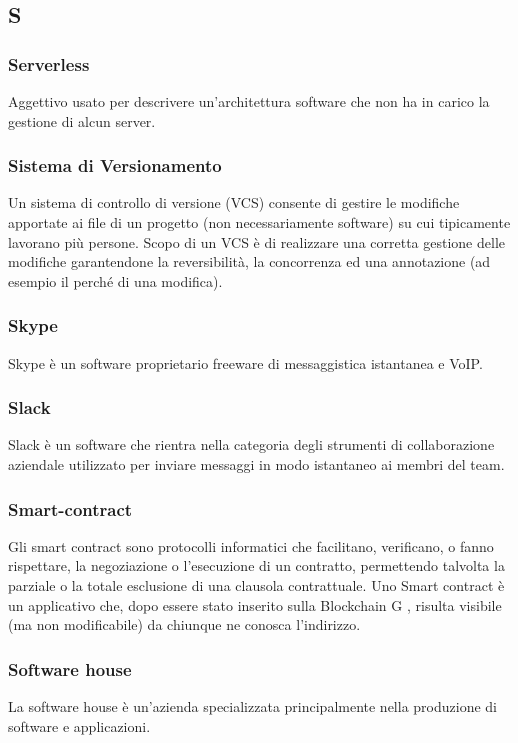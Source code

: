 \subsection*{\textbf{\hfill \Huge{S} \hfill}} 

\subsubsection*{Serverless}
Aggettivo usato per descrivere un'architettura software che non ha in carico la gestione di alcun server.

\subsubsection*{Sistema di Versionamento}
Un sistema di controllo di versione (VCS) consente di gestire le modifiche apportate ai file di un progetto (non necessariamente software) su cui tipicamente lavorano più persone. Scopo di un VCS è di realizzare una corretta gestione delle modifiche garantendone la reversibilità, la concorrenza ed una annotazione (ad esempio il perché di una modifica).
\subsubsection*{Skype}
Skype è un software proprietario freeware di messaggistica istantanea e VoIP.
\subsubsection*{Slack}
Slack è un software che rientra nella categoria degli strumenti di collaborazione aziendale utilizzato per inviare messaggi in modo istantaneo ai membri del team.
\subsubsection*{Smart-contract}
Gli smart contract sono protocolli informatici che facilitano, verificano, o fanno rispettare, la negoziazione o l’esecuzione di un contratto, permettendo talvolta la parziale o la totale esclusione di una clausola contrattuale. Uno Smart contract è un applicativo che, dopo essere stato inserito sulla Blockchain G , risulta visibile (ma non modificabile) da chiunque ne conosca l’indirizzo.
\subsubsection*{Software house}
La software house è un'azienda specializzata principalmente nella produzione di software e applicazioni.
